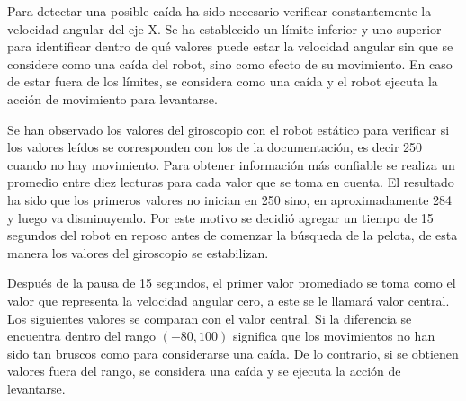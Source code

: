 Para detectar una posible caída ha sido necesario verificar constantemente la velocidad angular del eje X. Se ha establecido un límite inferior y uno superior para identificar dentro de qué valores puede estar la velocidad angular sin que se considere como una caída del robot, sino como efecto de su movimiento. En caso de estar fuera de los límites, se considera como una caída y el robot ejecuta la acción de movimiento para levantarse.  

Se han observado los valores del giroscopio con el robot estático para verificar si los valores leídos se corresponden con los de la documentación, es decir 250 cuando no hay movimiento. Para obtener información más confiable se realiza un promedio entre diez lecturas para cada valor que se toma en cuenta. El resultado ha sido que los primeros valores no inician en 250 sino, en aproximadamente 284 y luego va disminuyendo. Por este motivo se decidió agregar un tiempo de 15 segundos del robot en reposo antes de comenzar la búsqueda de la pelota, de esta manera los valores del giroscopio se estabilizan. 

Después de la pausa de 15 segundos, el primer valor promediado se toma como el valor que representa la velocidad angular cero, a este se le llamará valor central. Los siguientes valores se comparan con el valor central. Si la diferencia se encuentra dentro del rango $(-80,100)$ significa que los movimientos no han sido tan bruscos como para considerarse una caída. De lo contrario, si se obtienen valores fuera del rango, se considera una caída y se ejecuta la acción de levantarse.   


